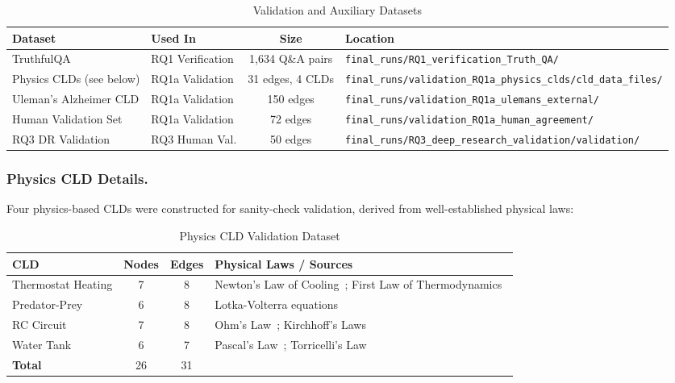 \begin{table}[H]
\centering
\caption{Validation and Auxiliary Datasets}
\label{tab:validation_datasets}
\footnotesize
\begin{tabularx}{\textwidth}{@{}l l c X@{}}
\toprule
\textbf{Dataset} & \textbf{Used In} & \textbf{Size} & \textbf{Location} \\
\midrule
TruthfulQA~\cite{lin2022truthfulqa} & RQ1 Verification & 1,634 Q\&A pairs & \texttt{final\_runs/RQ1\_verification\_Truth\_QA/} \\
Physics CLDs (see below) & RQ1a Validation & 31 edges, 4 CLDs & \texttt{final\_runs/validation\_RQ1a\_physics\_clds/cld\_data\_files/} \\
Uleman's Alzheimer CLD & RQ1a Validation & 150 edges & \texttt{final\_runs/validation\_RQ1a\_ulemans\_external/} \\
Human Validation Set & RQ1a Validation & 72 edges & \texttt{final\_runs/validation\_RQ1a\_human\_agreement/} \\
RQ3 DR Validation & RQ3 Human Val. & 50 edges & \texttt{final\_runs/RQ3\_deep\_research\_validation/validation/} \\
\bottomrule
\end{tabularx}
\end{table}

\subsubsection{Physics CLD Details.} Four physics-based CLDs were constructed for sanity-check validation, derived from well-established physical laws:

\begin{table}[H]
\centering
\caption{Physics CLD Validation Dataset}
\label{tab:physics_cld_dataset}
\footnotesize
\begin{tabularx}{\textwidth}{@{}l c c X@{}}
\toprule
\textbf{CLD} & \textbf{Nodes} & \textbf{Edges} & \textbf{Physical Laws / Sources} \\
\midrule
Thermostat Heating & 7 & 8 & Newton's Law of Cooling~\cite{newton1701scala}; First Law of Thermodynamics~\cite{clausius1850heat} \\
Predator-Prey & 6 & 8 & Lotka-Volterra equations~\cite{lotka1925elements,volterra1928fluctuations} \\
RC Circuit & 7 & 8 & Ohm's Law~\cite{ohm1827galvanische}; Kirchhoff's Laws~\cite{kirchhoff1845durchgang} \\
Water Tank & 6 & 7 & Pascal's Law~\cite{pascal1663equilibre}; Torricelli's Law~\cite{torricelli1644opera} \\
\midrule
\textbf{Total} & 26 & 31 & \\
\bottomrule
\end{tabularx}
\end{table}

